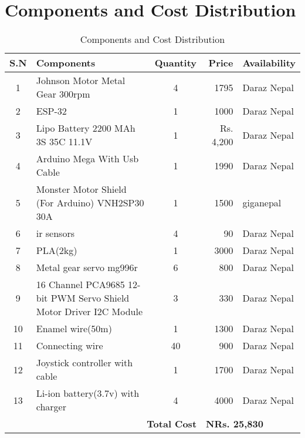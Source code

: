 \section*{Components and Cost Distribution}
\begin{table}[h]
\centering
\begin{tabular}{|c|l|c|r|l|}
\hline
\textbf{S.N} & \textbf{Components} & \textbf{Quantity} & \textbf{Price} & \textbf{Availability} \\
\hline
1 & Johnson Motor Metal Gear 300rpm & 4 & 1795 & Daraz Nepal \\
\hline
2 & ESP-32 & 1 & 1000 & Daraz Nepal \\
\hline
3 & Lipo Battery 2200 MAh 3S 35C 11.1V & 1 & Rs. 4,200 & Daraz Nepal \\
\hline
4 & Arduino Mega With Usb Cable & 1 & 1990 & Daraz Nepal \\
\hline
5 & Monster Motor Shield (For Arduino) VNH2SP30 30A & 1 & 1500 &  giganepal \\
\hline 
6 & ir sensors & 4 & 90 & Daraz Nepal \\
\hline
7 & PLA(2kg) & 1 & 3000 & Daraz Nepal \\
\hline
8 & Metal gear servo mg996r & 6 & 800 & Daraz Nepal \\
\hline
9 & 16 Channel PCA9685 12-bit PWM Servo Shield Motor Driver I2C Module  & 3 & 330 & Daraz Nepal \\
\hline
10 & Enamel wire(50m) & 1 & 1300 & Daraz Nepal \\
\hline
11 & Connecting wire & 40 & 900 & Daraz Nepal \\
\hline
12 & Joystick controller with cable & 1 & 1700 & Daraz Nepal \\
\hline
13 & Li-ion battery(3.7v) with charger & 4 & 4000 & Daraz Nepal \\
\hline
\multicolumn{3}{|r|}{\textbf{Total Cost}} & \multicolumn{2}{l|}{\textbf{NRs. 25,830}} \\
\hline
\end{tabular}
\caption{Components and Cost Distribution}
\end{table}